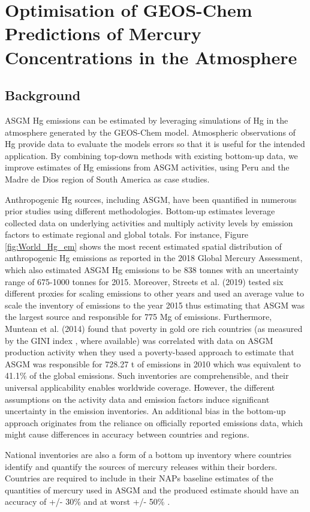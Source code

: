 \chapter{Optimisation of GEOS-Chem Predictions of Mercury Concentrations in the Atmosphere}
\section{Background}
\begin{flushleft}


ASGM Hg emissions can be estimated by leveraging simulations of Hg in the atmosphere generated by the GEOS-Chem model. Atmospheric observations of Hg provide data to evaluate the models errors so that it is useful for the intended application. By combining top-down methods with existing bottom-up data, we improve estimates of Hg emissions from ASGM activities, using Peru and the Madre de Dios region of South America as case studies.

Anthropogenic Hg sources, including ASGM, have been quantified in numerous prior studies using different methodologies. Bottom-up estimates leverage collected data on underlying activities and multiply activity levels by emission factors to estimate regional and global totals. For instance, Figure \ref{fig:World_Hg_em} shows the most recent estimated spatial distribution of anthropogenic Hg emissions as reported in the 2018 Global Mercury Assessment, which also estimated ASGM Hg emissions to be 838 tonnes with an uncertainty range of 675-1000 tonnes for 2015\cite{united_nations_environment_programme_technical_2019}. Moreover, Streets et al. (2019) tested six different proxies for scaling emissions to other years and used an average value to scale the inventory of emissions to the year 2015 thus estimating that ASGM was the largest source and responsible for 775 Mg of emissions\cite{streets_global_2019}. Furthermore, Muntean et al. (2014) found that poverty in  gold ore rich countries (as measured by the GINI index \cite{sadefo_kamdem_nice_2012}, where available) was correlated with data on ASGM production activity when they used a poverty-based approach to estimate that ASGM was responsible for 728.27 t of emissions in 2010 which was equivalent to 41.1\% of the global emissions\cite{muntean_evaluating_2018}. Such inventories are comprehensible, and their universal applicability enables worldwide coverage. However, the different assumptions on the activity data and emission factors induce significant uncertainty in the emission inventories. An additional bias in the bottom-up approach originates from the reliance on officially reported emissions data, which might cause differences in accuracy between countries and regions.

National inventories are also a form of a bottom up inventory where countries identify and quantify the sources of mercury releases within their borders. Countries are required to include in their NAPs baseline estimates of the quantities of mercury used in ASGM and the produced estimate should have an accuracy of +/- 30\% and at worst +/- 50\% \cite{united_nations_environment_programme_estimating_2017}.
\end{flushleft}

